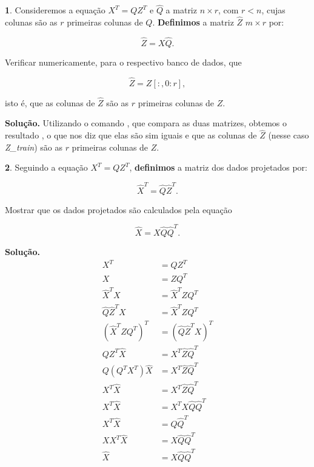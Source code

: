 \documentclass[a4paper, 12pt]{article}
\theoremstyle{definition}
\newtheorem{questao}{}
\newenvironment{solucao}{\noindent\textbf{Solução.}}{}
\theoremstyle{remark}
\begin{document}
\begin{questao}
    Consideremos a equação $X^T = QZ^T$ e $\hat{Q}$ a matriz $n \times r$, com $r < n$, cujas colunas são as $r$ primeiras colunas de $Q$. \textbf{Definimos} a matriz $\hat{Z}$ $m \times r$ por:
    
    $$\hat{Z} = X\hat{Q}.$$
    
    Verificar numericamente, para o respectivo banco de dados, que
    
    $$\hat{Z} = Z[:, 0:r],$$
    
    isto é, que as colunas de $\hat{Z}$ são as $r$ primeiras colunas de $Z$.
\end{questao}

\begin{solucao}
 Utilizando o comando , que compara as duas matrizes, obtemos o resultado , o que nos diz que elas são sim iguais e que as colunas de $\hat{Z}$ (nesse caso \textit{Z\_train}) são as $r$ primeiras colunas de $Z$.
\end{solucao}

\begin{questao}
    Seguindo a equação $X^T = QZ^T$, \textbf{definimos} a matriz dos dados projetados por:
    
    $$\hat{X}^T = \hat{Q}\hat{Z}^T.$$
    
    Mostrar que os dados projetados são calculados pela equação
    
    $$\hat{X} = X\hat{Q}\hat{Q}^T.$$
\end{questao}

\begin{solucao}
\begin{align*}
X^T &= QZ^T \\
X &= ZQ^T\\
\hat{X}^TX &= \hat{X}^TZQ^T\\
\hat{Q}\hat{Z}^TX &= \hat{X}^TZQ^T\\
(\hat{X}^TZQ^T)^T &= (\hat{Q}\hat{Z}^TX)^T\\
QZ^T\hat{X} &= X^T\hat{Z}\hat{Q}^T\\
Q(Q^TX^T)\hat{X} &= X^T\hat{Z}\hat{Q}^T\\
X^T\hat{X} &= X^T\hat{Z}\hat{Q}^T\\
X^T\hat{X} &= X^TX\hat{Q}\hat{Q}^T\\
X^T\hat{X} &= \hat{Q}\hat{Q}^T\\
XX^T\hat{X} &= X\hat{Q}\hat{Q}^T\\
\hat{X} &= X\hat{Q}\hat{Q}^T
\end{align*}
\end{solucao}
\end{document}
